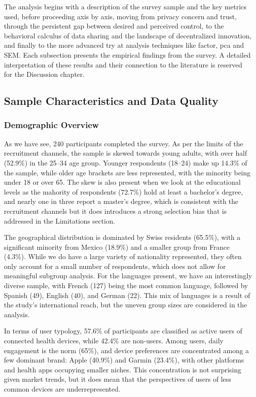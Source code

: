 The analysis begins with a description of the survey sample and the key metrics used, before proceeding axis by axis, moving from privacy concern and trust, through the persistent gap between desired and perceived control, to the behavioral calculus of data sharing and the landscape of decentralized innovation, and finally to the more advanced try at analysis techniques like factor, pca and SEM. Each subsection presents the empirical findings from the survey. A detailed interpretation of these results and their connection to the literature is reserved for the Discussion chapter.
\subsection{Sample Characteristics and Data Quality}
	\subsubsection{Demographic Overview}
	As we have see, 240 participants completed the survey. As per the limits of the recruitment channels, the sample is skewed towards young adults, with over half (52.9\%) in the 25--34 age group. Younger respondents (18--24) make up 14.3\% of the sample, while older age brackets are less represented, with the minority being under 18 or over 65. The skew is also present when we look at the educational levels as the mahority of respondents (72.7\%) hold at least a bachelor’s degree, and nearly one in three report a master’s degree, which is consistent with the recruitment channels but it does introduces a strong selection bias that is addressed in the Limitations section.  
	
	The geographical distribution is dominated by Swiss residents (65.5\%), with a significant minority from Mexico (18.9\%) and a smaller group from France (4.3\%). While we do have a large variety of nationality represented, they often only account for a small number of respondents, which does not allow for meaningful subgroup analysis. For the languages present, we have an interestingly diverse sample, with French (127) being the most common language, followed by Spanish (49), English (40), and German (22). This mix of languages is a result of the study's international reach, but the uneven group sizes are considered in the analysis.
	
	In terms of user typology, 57.6\% of participants are classified as active users of connected health devices, while 42.4\% are non-users. Among users, daily engagement is the norm (65\%), and device preferences are concentrated among a few dominant brand: Apple (40.9\%) and Garmin (23.4\%), with other platforms and health apps occupying smaller niches. This concentration is not surprising given market trends, but it does mean that the perspectives of users of less common devices are underrepresented.
	

